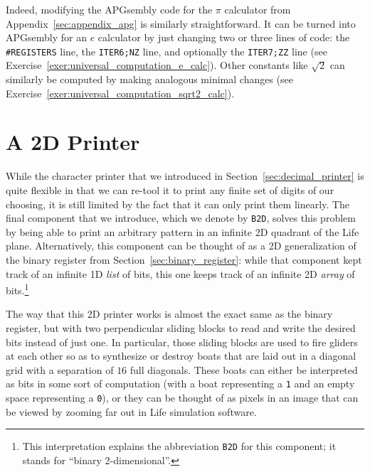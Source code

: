 Indeed, modifying the APGsembly code for the $\pi$ calculator from Appendix~\ref{sec:appendix_apg} is similarly straightforward. It can be turned into APGsembly for an $e$ calculator by just changing two or three lines of code: the \texttt{\#REGISTERS} line, the \texttt{ITER6;NZ} line, and optionally the \texttt{ITER7;ZZ} line (see Exercise~\ref{exer:universal_computation_e_calc}). Other constants like $\sqrt{2}$ can similarly be computed by making analogous minimal changes (see Exercise~\ref{exer:universal_computation_sqrt2_calc}).



\section{A 2D Printer}\label{sec:2dprinter}

While the character printer that we introduced in Section~\ref{sec:decimal_printer} is quite flexible in that we can re-tool it to print any finite set of digits of our choosing, it is still limited by the fact that it can only print them linearly. The final component that we introduce, which we denote by \texttt{B2D}, solves this problem by being able to print an arbitrary pattern in an infinite 2D quadrant of the Life plane. Alternatively, this component can be thought of as a 2D generalization of the binary register from Section~\ref{sec:binary_register}: while that component kept track of an infinite 1D \emph{list} of bits, this one keeps track of an infinite 2D \emph{array} of bits.\footnote{This interpretation explains the abbreviation \texttt{B2D} for this component; it stands for ``binary 2-dimensional''.}

The way that this 2D printer works is almost the exact same as the binary register, but with two perpendicular sliding blocks to read and write the desired bits instead of just one. In particular, those sliding blocks are used to fire gliders at each other so as to synthesize or destroy boats that are laid out in a diagonal grid with a separation of $16$ full diagonals. These boats can either be interpreted as bits in some sort of computation (with a boat representing a \texttt{1} and an empty space representing a \texttt{0}), or they can be thought of as pixels in an image that can be viewed by zooming far out in Life simulation software.


